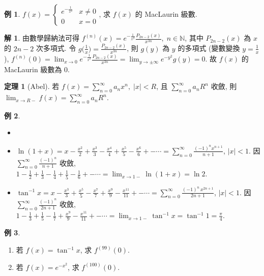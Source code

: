 \documentclass[12pt]{extarticle}
\newcommand{\ds}{\displaystyle}
\theoremstyle{definition}
\newtheorem*{thm}{定理}
\newtheorem*{ex}{例}
\newtheorem*{sol}{解}
\begin{document}
\begin{ex}
  $\ds f(x) = \begin{cases}e^{-\frac{1}{x^2}} & x\ne 0 \\ 0 & x = 0\end{cases}$, 求 $f(x)$ 的 MacLaurin 級數.  
\end{ex}

\begin{sol}
  由數學歸納法可得 $\ds f^{(n)}(x) = e^{-\frac{1}{x^2}}\frac{P_{2n - 2}(x)}{x^{3n}},\;n\in\mathbb{N}$, 其中 $P_{2n - 2}(x)$ 為 $x$ 的 $2n - 2$ 次多項式. 令 $\ds g\Big(\frac{1}{x}\Big) = \frac{P_{2n - 2}(x)}{x^{3n}}$, 則 $g(y)$ 為 $y$ 的多項式 (變數變換 $\ds y = \frac{1}{x}$), $\ds f^{(n)}(0) = \lim_{x\to 0}e^{-\frac{1}{x^2}}\frac{P_{2n - 2}(x)}{x^{3n}} = \lim_{y\to\pm\infty}e^{-y^2}g(y) = 0$. 故 $f(x)$ 的 MacLaurin 級數為 $0$. 
\end{sol}

\begin{thm}[Abel]
  若 $\ds f(x) = \sum_{n = 0}^\infty a_n x^n,\;|x| < R$, 且 $\ds\sum_{n = 0}^\infty a_n R^n$ 收斂, 則 $\ds\lim_{x\to R-}f(x) = \sum_{n = 0}^\infty a_n R^n$. 
\end{thm}

\begin{ex}
  \begin{itemize}\setlength{\itemsep}{-1pt}
    \item[]
    \item $\ds\ln(1 + x) = x - \frac{x^2}{2} + \frac{x^3}{3} - \frac{x^4}{4} + \frac{x^5}{5} - \frac{x^6}{6} +- \cdots = \sum_{n = 0}^\infty\frac{(-1)^n x^{n + 1}}{n + 1}$, $|x| < 1$. 因 $\ds\sum_{n = 0}^\infty\frac{(-1)^n}{n + 1}$ 收斂, $\ds 1 - \frac{1}{2} + \frac{1}{3} - \frac{1}{4} + \frac{1}{5} - \frac{1}{6} +- \cdots = \lim_{x\to 1-}\ln(1 + x) = \ln 2$.
    \item $\ds\tan^{-1}x = x - \frac{x^3}{3} + \frac{x^5}{5} - \frac{x^7}{7} + \frac{x^9}{9} - \frac{x^{11}}{11} +- \cdots = \sum_{n = 0}^\infty\frac{(-1)^n\,x^{2n + 1}}{2 n + 1}$, $|x| < 1$. 因 $\ds\sum_{n = 0}^\infty\frac{(-1)^n}{2 n + 1}$ 收斂, $\ds1 - \frac{1}{3} + \frac{1}{5} - \frac{1}{7} + \frac{x^9}{9} - \frac{x^{11}}{11} +- \cdots = \lim_{x\to 1-}\tan^{-1}x = \tan^{-1}1 = \frac{\pi}{4}$.
  \end{itemize}
\end{ex}

\begin{ex}
  \begin{multicols}{2}
  \begin{enumerate}\setlength{\itemsep}{-1pt}
    \item 若 $\ds f(x) = \tan^{-1}{x}$, 求 $\ds f^{(99)}(0)$. 
    \item 若 $\ds f(x) = e^{-x^2}$, 求 $\ds f^{(100)}(0)$. 
  \end{enumerate}
\end{multicols}
\end{ex}
\end{document}
